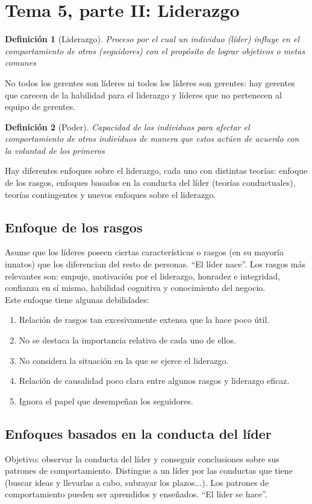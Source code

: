 \documentclass[12pt]{article}
\theoremstyle{definition_wo_parentheses}
\newtheorem{definicion}{Definición}[section]
\begin{document}
\section{Tema 5, parte II: Liderazgo}
\begin{definicion}[Liderazgo]
	Proceso por el cual un individuo (líder) influye en el comportamiento de otros (seguidores) con el propósito de lograr objetivos o metas comunes
\end{definicion}

No todos los gerentes son líderes ni todos los líderes son gerentes: hay gerentes que carecen de la habilidad para el liderazgo y líderes que no pertenecen al equipo de gerentes.

\begin{definicion}[Poder]
 Capacidad de los individuos para afectar el comportamiento de otros individuos de manera que estos actúen de acuerdo con la voluntad de los primeros
\end{definicion}

Hay diferentes enfoques sobre el liderazgo, cada uno con distintas teorías: enfoque de los rasgos, enfoques basados en la conducta del líder (teorías conductuales), teorías contingentes y nuevos enfoques sobre el liderazgo.

\subsection{Enfoque de los rasgos}
Asume que los líderes poseen ciertas características o rasgos (en su mayoría innatos) que los diferencian del resto de personas. ``El líder nace''. Los rasgos más relevantes son: empuje, motivación por el liderazgo, honradez e integridad, confianza en sí mismo, habilidad cognitiva y conocimiento del negocio.\\
Este enfoque tiene algunas debilidades:
\begin{enumerate}
\item Relación de rasgos tan excesivamente extensa que la hace poco útil.
\item No se destaca la importancia relativa de cada uno de ellos.
\item No considera la situación en la que se ejerce el liderazgo.
\item Relación de causalidad poco clara entre algunos rasgos y liderazgo eficaz.
\item Ignora el papel que desempeñan los seguidores.
\end{enumerate}

\subsection{Enfoques basados en la conducta del líder}
Objetivo: observar la conducta del líder y conseguir conclusiones sobre sus patrones de comportamiento. Distingue a un líder por las conductas que tiene (buscar ideas y llevarlas a cabo, subrayar los plazos...). Los patrones de comportamiento pueden ser aprendidos y enseñados. ``El líder se hace''.
\end{document}
